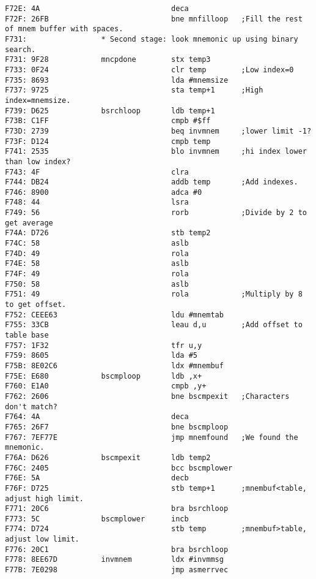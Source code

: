 {\begin{verbatim}
F72E: 4A                              deca
F72F: 26FB                            bne mnfilloop   ;Fill the rest of mnem buffer with spaces.
F731:                 * Second stage: look mnemonic up using binary search.
F731: 9F28            mncpdone        stx temp3
F733: 0F24                            clr temp        ;Low index=0
F735: 8693                            lda #mnemsize
F737: 9725                            sta temp+1      ;High index=mnemsize.
F739: D625            bsrchloop       ldb temp+1
F73B: C1FF                            cmpb #$ff
F73D: 2739                            beq invmnem     ;lower limit -1?
F73F: D124                            cmpb temp
F741: 2535                            blo invmnem     ;hi index lower than low index?
F743: 4F                              clra
F744: DB24                            addb temp       ;Add indexes.
F746: 8900                            adca #0         
F748: 44                              lsra
F749: 56                              rorb            ;Divide by 2 to get average
F74A: D726                            stb temp2
F74C: 58                              aslb
F74D: 49                              rola
F74E: 58                              aslb            
F74F: 49                              rola            
F750: 58                              aslb
F751: 49                              rola            ;Multiply by 8 to get offset.
F752: CEEE63                          ldu #mnemtab
F755: 33CB                            leau d,u        ;Add offset to table base
F757: 1F32                            tfr u,y
F759: 8605                            lda #5
F75B: 8E02C6                          ldx #mnembuf
F75E: E680            bscmploop       ldb ,x+
F760: E1A0                            cmpb ,y+
F762: 2606                            bne bscmpexit   ;Characters don't match?
F764: 4A                              deca
F765: 26F7                            bne bscmploop
F767: 7EF77E                          jmp mnemfound   ;We found the mnemonic.
F76A: D626            bscmpexit       ldb temp2
F76C: 2405                            bcc bscmplower
F76E: 5A                              decb
F76F: D725                            stb temp+1      ;mnembuf<table, adjust high limit.
F771: 20C6                            bra bsrchloop
F773: 5C              bscmplower      incb
F774: D724                            stb temp        ;mnembuf>table, adjust low limit.
F776: 20C1                            bra bsrchloop
F778: 8EE67D          invmnem         ldx #invmmsg    
F77B: 7E0298                          jmp asmerrvec

\end{verbatim}}
